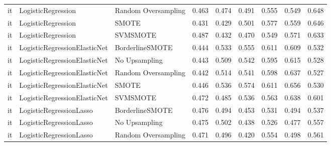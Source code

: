 \begin{tabular}{lllllllll}
      it &              LogisticRegression &           Random Oversampling & 0.463 &                     0.474 &                 0.491 &                  0.555 &                                   0.549 &     0.648 \\
      it &              LogisticRegression &                         SMOTE & 0.431 &                     0.429 &                 0.501 &                  0.577 &                                   0.559 &     0.646 \\
      it &              LogisticRegression &                      SVMSMOTE & 0.487 &                     0.432 &                 0.470 &                  0.549 &                                   0.571 &     0.633 \\
      it &    LogisticRegressionElasticNet &               BorderlineSMOTE & 0.444 &                     0.533 &                 0.555 &                  0.611 &                                   0.609 &     0.532 \\
      it &    LogisticRegressionElasticNet &                 No Upsampling & 0.443 &                     0.509 &                 0.542 &                  0.595 &                                   0.615 &     0.528 \\
      it &    LogisticRegressionElasticNet &           Random Oversampling & 0.442 &                     0.514 &                 0.541 &                  0.598 &                                   0.637 &     0.527 \\
      it &    LogisticRegressionElasticNet &                         SMOTE & 0.446 &                     0.536 &                 0.574 &                  0.611 &                                   0.656 &     0.530 \\
      it &    LogisticRegressionElasticNet &                      SVMSMOTE & 0.472 &                     0.485 &                 0.536 &                  0.563 &                                   0.638 &     0.601 \\
      it &         LogisticRegressionLasso &               BorderlineSMOTE & 0.476 &                     0.494 &                 0.453 &                  0.531 &                                   0.494 &     0.537 \\
      it &         LogisticRegressionLasso &                 No Upsampling & 0.475 &                     0.502 &                 0.438 &                  0.526 &                                   0.477 &     0.557 \\
      it &         LogisticRegressionLasso &           Random Oversampling & 0.471 &                     0.496 &                 0.420 &                  0.554 &                                   0.498 &     0.561 \\

\end{tabular}
